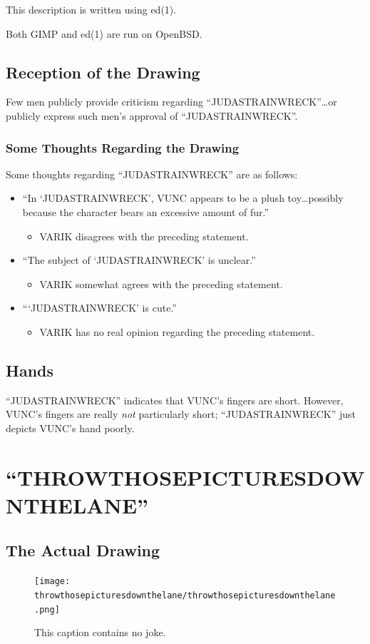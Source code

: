 \documentclass{report}
\begin{document}
This description is written using ed(1).

Both GIMP and ed(1) are run on OpenBSD.
\section{Reception of the Drawing}
Few men publicly provide criticism regarding ``JUDASTRAINWRECK''\ldots or publicly express such men's approval of ``JUDASTRAINWRECK''.
\subsection{Some Thoughts Regarding the Drawing}
Some thoughts regarding ``JUDASTRAINWRECK'' are as follows:
\begin{itemize}
	\item ``In `JUDASTRAINWRECK', VUNC appears to be a plush toy\ldots possibly because the character bears an excessive amount of fur.''
	\begin{itemize}
		\item VARIK disagrees with the preceding statement.
	\end{itemize}
	\item ``The subject of `JUDASTRAINWRECK' is unclear.''
	\begin{itemize}
		\item VARIK somewhat agrees with the preceding statement.
	\end{itemize}
	\item ```JUDASTRAINWRECK' is cute.''
	\begin{itemize}
		\item VARIK has no real opinion regarding the preceding statement.
	\end{itemize}
\end{itemize}
\section{Hands}
``JUDASTRAINWRECK'' indicates that VUNC's fingers are short.  However, VUNC's fingers are really \textit{not} particularly short; ``JUDASTRAINWRECK'' just depicts VUNC's hand poorly.
\chapter{``THROWTHOSEPICTURESDOWNTHELANE''}
\section{The Actual Drawing}
\begin{figure}[ht]
	\centering
	\texttt{[image: throwthosepicturesdownthelane/throwthosepicturesdownthelane.png]}
	\caption[center]{This caption contains no joke.}
\end{figure}
\end{document}
